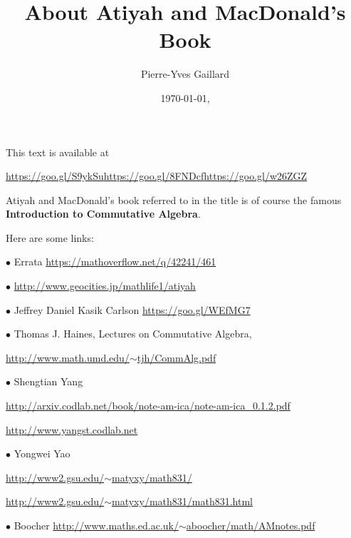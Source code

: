\documentclass[parskip=half]{scrartcl}%
\title{About Atiyah and MacDonald's Book}
\author{Pierre-Yves Gaillard}
\date{\today,\currenttime}
\newcommand{\bu}{\bullet}
\begin{document}


\maketitle\tableofcontents

This text is available at 

\href{http://www.iecl.univ-lorraine.fr/~Pierre-Yves.Gaillard/DIVERS/Atiyah_MacDonald_c/}{https://goo.gl/S9ykSu}\quad\href{https://github.com/Pierre-Yves-Gaillard/Atiyah_MacDonald_c/blob/master/Atiyah_MacDonald_c.tex}{https://goo.gl/8FNDcf}\quad\href{https://docs.google.com/document/d/1AW4qMXoarPW1L1Nxbgy4bODorWEpE6_Gdd35sFJKyew/edit?usp=sharing}{https://goo.gl/w26ZGZ}

Atiyah and MacDonald's book referred to in the title is of course the famous \textbf{Introduction to Commutative Algebra}.

Here are some links:

$\bu$ Errata \href{https://mathoverflow.net/q/42241/461}{https://mathoverflow.net/q/42241/461}

$\bu$ \href{http://www.geocities.jp/mathlife1/atiyah}{http://www.geocities.jp/mathlife1/atiyah}

$\bu$ Jeffrey Daniel Kasik Carlson \href{https://goo.gl/WEfMG7}{https://goo.gl/WEfMG7}

$\bu$ Thomas J. Haines, Lectures on Commutative Algebra, 

\href{http://www.math.umd.edu/~tjh/CommAlg.pdf}{http://www.math.umd.edu/$\sim$tjh/CommAlg.pdf}

$\bu$ Shengtian Yang 

\href{http://arxiv.codlab.net/book/note-am-ica/note-am-ica_0.1.2.pdf}{\small http://arxiv.codlab.net/book/note-am-ica/note-am-ica\_0.1.2.pdf}

\href{http://www.yangst.codlab.net}{http://www.yangst.codlab.net}

$\bu$ Yongwei Yao

\href{http://www2.gsu.edu/~matyxy/math831/}{http://www2.gsu.edu/$\sim$matyxy/math831/}

\href{http://www2.gsu.edu/~matyxy/math831/math831.html}{http://www2.gsu.edu/$\sim$matyxy/math831/math831.html}


$\bu$ Boocher \href{http://www.maths.ed.ac.uk/~aboocher/math/AMnotes.pdf}{\small http://www.maths.ed.ac.uk/$\sim$aboocher/math/AMnotes.pdf}
\end{document}
